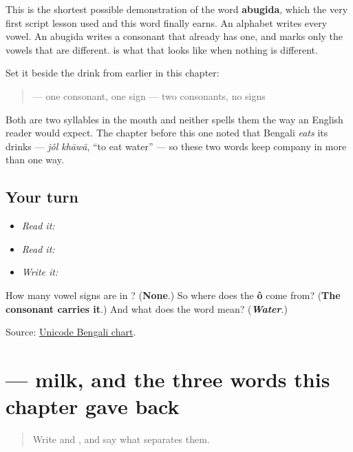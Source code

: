This is the shortest possible demonstration of the word \textbf{abugida}, which the very first script lesson used and this word finally earns. An alphabet writes every vowel. An abugida writes a consonant that already has one, and marks only the vowels that are different. \textbf{} is what that looks like when nothing is different.

Set it beside the drink from earlier in this chapter:

\begin{quote}
\textbf{} — one consonant, one sign \textbf{} — two consonants, no signs
\end{quote}

Both are two syllables in the mouth and neither spells them the way an English reader would expect. The chapter before this one noted that Bengali \emph{eats} its drinks — \emph{jôl khāwā}, \textquotedblleft{}to eat water\textquotedblright{} — so these two words keep company in more than one way.

\subsection*{Your turn}
\begin{itemize}
\raggedright
  \item \emph{Read it:} 
  \item \emph{Read it:}  
  \item \emph{Write it:} 
\end{itemize}

\begin{tcolorbox}[breakable,colback=teal!4,colframe=teal!35!black,title={Before you move on}]
How many vowel signs are in \textbf{}? (\textbf{None}.) So where does the \textbf{ô} come from? (\textbf{The consonant carries it}.) And what does the word mean? (\emph{\textbf{Water}}.)

Source: \href{https://www.unicode.org/charts/PDF/U0980.pdf}{Unicode Bengali chart}.
\end{tcolorbox}
\section[\texorpdfstring{\bn{দুধ} (dudh)}{দুধ (dudh)}]{ — milk, and the three words this chapter gave back}

\label{lesson:BN-W03-dudh-read}



\begin{quote}
Write \textbf{} and \textbf{}, and say what separates them.
\end{quote}


